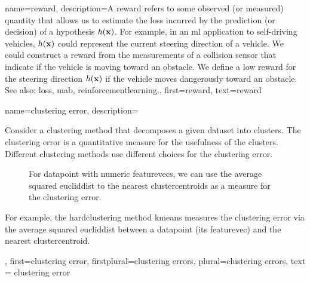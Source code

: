 {name={reward}, 
	description={A reward refers to some observed 
		(or measured) quantity that allows us to estimate the \gls{loss} incurred by the \gls{prediction} 
		(or decision) of a \gls{hypothesis} $h({\bf x})$. For example, in an 
		\gls{ml} application to self-driving vehicles, $h({\bf x})$ could represent 
		the current steering direction of a vehicle. We could construct a reward from the 
		measurements of a collision sensor that indicate if the vehicle is moving toward 
		an obstacle. We define a low reward for the steering direction 
		$h({\bf x})$ if the vehicle moves dangerously toward an obstacle.
			\\
		See also: \gls{loss}, \gls{mab}, \gls{reinforcementlearning}.},
	first={reward}, 
	text={reward}
} 

{name={clustering error}, 
	description={Consider a \gls{clustering} method that decomposes 
	a given \gls{dataset} into \glspl{cluster}. The \gls{clustering} error is a quantitative 
	measure for the usefulness of the \glspl{cluster}. Different \gls{clustering} methods 
	use different choices for the \gls{clustering} error. 
	\begin{figure}
\centering
{}
\caption{For \gls{datapoint} with numeric \glspl{featurevec}, we can use the 
average squared \gls{eucliddist} to the nearest \glspl{clustercentroid} as a measure for the \gls{clustering} error.}
\end{figure}
	For example, the \gls{hardclustering} 
	method \gls{kmeans} measures the \gls{clustering} error via the average squared 
	\gls{eucliddist} between a \gls{datapoint} (its \gls{featurevec}) and the nearest \gls{clustercentroid}. 
	}, 
	first={clustering error}, 
	firstplural={clustering errors}, 
	plural={clustering errors}, 
	text = {clustering error}
}



